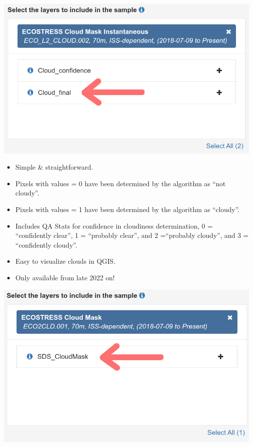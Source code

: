 \documentclass[oneside,a4paper,11pt,explicit]{book}
\begin{document}
	\begin{tcbraster}[raster columns=3, sharp corners, 
		raster equal height, raster column skip=-.5mm]
		\begin{tcolorbox}[colback=yellow!5!white,colframe=green!20!black,
			colbacktitle=green!60!black,title=Cloud\_final]
			\begin{center}
				\includegraphics[width=\columnwidth]{Cloud_final.png}
			\end{center}
			\begin{itemize}[leftmargin=*]
				\item Simple \& straightforward.
				\item Pixels with values = 0 have been determined by the algorithm as ``not cloudy''.
				\item Pixels with values = 1 have been determined by the algorithm as ``cloudy''.
				\item Includes QA Stats for confidence in cloudiness determination, 0 = ``confidently clear'', 1 = ``probably clear'', and 2 =``probably cloudy'', and 3 = ``confidently cloudy''.
				\item Easy to visualize clouds in QGIS.
				\item Only available from late 2022 on!
			\end{itemize}
		\end{tcolorbox}
		\begin{tcolorbox}[colback=yellow!5!white,colframe=green!20!black, colbacktitle=green!60!black,title=SDS\_CloudMask]
			\begin{center}
				\includegraphics[width=\columnwidth]{SDS_CloudMask.png}

\end{center}
\end{tcolorbox}
\end{tcbraster}
\end{document}
